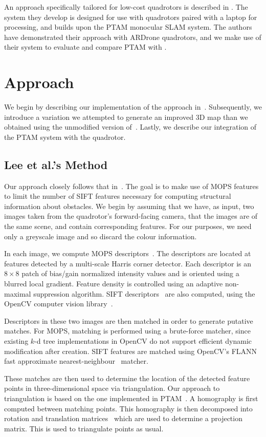 \documentclass{acmsiggraph}
\begin{document}
An approach specifically tailored for low-cost quadrotors is described in \cite{engel2012a,engel2012b}. The system they develop is designed for use with quadrotors paired with a laptop for processing, and builds upon the PTAM monocular SLAM system. The authors have demonstrated their approach with ARDrone quadrotors, and we make use of their system to evaluate and compare PTAM with \cite{lee2011}.

\section{Approach}
We begin by describing our implementation of the approach in~\cite{lee2011}. Subsequently, we introduce a variation we attempted to generate an improved 3D map than we obtained using the unmodified version of~\cite{lee2011}.  Lastly, we describe our integration of the PTAM system with the quadrotor.

\subsection{Lee et al.'s Method}
Our approach closely follows that in~\cite{lee2011}. The goal is to make use of MOPS features to limit the number of SIFT features necessary for computing structural information about obstacles. We begin by assuming that we have, as input, two images taken from the quadrotor's forward-facing camera, that the images are of the same scene, and contain corresponding features. For our purposes, we need only a greyscale image and so discard the colour information.

In each image, we compute MOPS descriptors~\cite{BSW05}. The descriptors are located at features detected by a multi-scale Harris corner detector. Each descriptor is an $8 \times 8$ patch of bias/gain normalized intensity values and is oriented using a blurred local gradient. Feature density is controlled using an adaptive non-maximal suppression algorithm. SIFT descriptors~\cite{lowe2004} are also computed, using the OpenCV computer vision library~\cite{opencv}.

Descriptors in these two images are then matched in order to generate putative matches. For MOPS, matching is performed using a brute-force matcher, since existing $k$-d tree implementations in OpenCV do not support efficient dynamic modification after creation. SIFT features are matched using OpenCV's FLANN fast approximate nearest-neighbour~\cite{flann2009} matcher.

These matches are then used to determine the location of the detected feature points in three-dimensional space via triangulation. Our approach to triangulation is based on the one implemented in PTAM~\cite{ptamcode}. A homography is first computed between matching points. This homography is then decomposed into rotation and translation matrices~\cite{inria2007} which are used to determine a projection matrix. This is used to triangulate points as usual.
\end{document}
